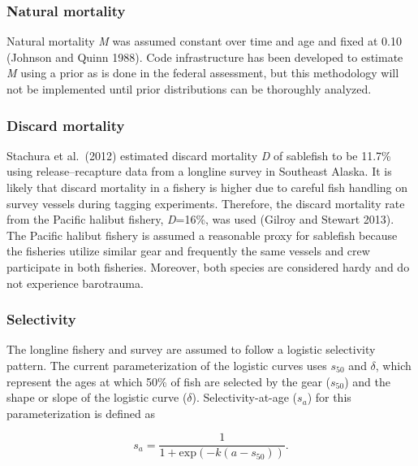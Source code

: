 \documentclass[
]{article}
\begin{document}
\hypertarget{natural-mortality}{%
\subsubsection{Natural mortality}\label{natural-mortality}}

Natural mortality \emph{M} was assumed constant over time and age and fixed at 0.10 (Johnson and Quinn 1988). Code infrastructure has been developed to estimate \emph{M} using a prior as is done in the federal assessment, but this methodology will not be implemented until prior distributions can be thoroughly analyzed.

\hypertarget{discard-mortality}{%
\subsubsection{Discard mortality}\label{discard-mortality}}

Stachura et al.~(2012) estimated discard mortality \emph{D} of sablefish to be 11.7\% using release--recapture data from a longline survey in Southeast Alaska. It is likely that discard mortality in a fishery is higher due to careful fish handling on survey vessels during tagging experiments. Therefore, the discard mortality rate from the Pacific halibut fishery, \emph{D}=16\%, was used (Gilroy and Stewart 2013). The Pacific halibut fishery is assumed a reasonable proxy for sablefish because the fisheries utilize similar gear and frequently the same vessels and crew participate in both fisheries. Moreover, both species are considered hardy and do not experience barotrauma.

\hypertarget{selectivity}{%
\subsubsection{Selectivity}\label{selectivity}}

The longline fishery and survey are assumed to follow a logistic selectivity pattern. The current parameterization of the logistic curves uses \emph{\(s_{50}\)} and \emph{\(\delta\)}, which represent the ages at which 50\% of fish are selected by the gear (\emph{\(s_{50}\)}) and the shape or slope of the logistic curve (\emph{\(\delta\)}). Selectivity-at-age (\emph{\(s_a\)}) for this parameterization is defined as

\[
\begin{equation}
s_a=\frac{1}{1+\mbox{exp}(-k(a-s_{50}))}.
\label{eq:sel2}
\end{equation}
\]
\end{document}
